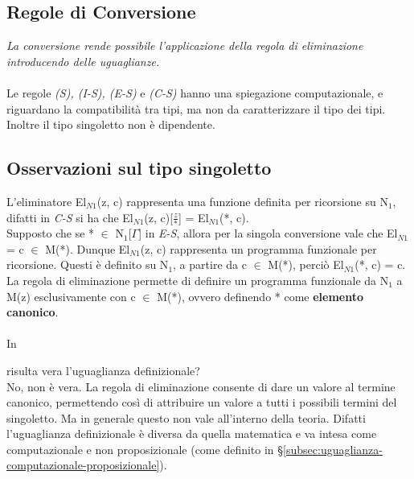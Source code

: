 \documentclass[10pt,a4paper, italian]{book}
\begin{document}
\subsection{Regole di Conversione}
\label{subsec:conversione}
\begin{prooftree}
\end{prooftree}
\textit{La conversione rende possibile l'applicazione della regola di eliminazione introducendo delle uguaglianze.}
\\\\
Le regole \textit{(S), (I-S), (E-S)} e \textit{(C-S)}  hanno una spiegazione computazionale, e riguardano la compatibilit\`a tra tipi, ma non da caratterizzare il tipo dei tipi.\\ Inoltre il tipo singoletto non \`e dipendente.
\subsection{Osservazioni sul tipo singoletto}
\label{subsec:osservazioni}
L'eliminatore El$_{N1}$(z, c) rappresenta una funzione definita per ricorsione su N$_1$, difatti in \textit{C-S} si ha che El$_{N1}$(z, c)[$\frac{z}{*}$] = El$_{N1}$(*, c).\\
Supposto che se * $\in$ N$_1$[$\Gamma$] in \textit{E-S}, allora per la singola conversione vale che El$_{N1}$ = c $\in$ M(*).
Dunque El$_{N1}$(z, c) rappresenta un programma funzionale per ricorsione. Questi \`e definito su N$_1$, a partire da c $\in$ M(*), perci\`o El$_{N1}$(*, c) = c.\\
La regola di eliminazione permette di definire un programma funzionale da N$_1$ a M(z) esclusivamente con c $\in$ M(*), ovvero definendo * come \textbf{elemento canonico}.
\\\\
In \begin{prooftree}
\end{prooftree}
risulta vera l'uguaglianza definizionale?\\
No, non \`e vera. La regola di eliminazione consente di dare un valore al termine canonico, permettendo cos\`i di attribuire un valore a tutti i possibili termini del singoletto. Ma in generale questo non vale all'interno della teoria. Difatti l'uguaglianza definizionale \`e diversa da quella matematica e va intesa come computazionale e non proposizionale (come definito in \S \ref{subsec:uguaglianza-computazionale-proposizionale}).
\end{document}
